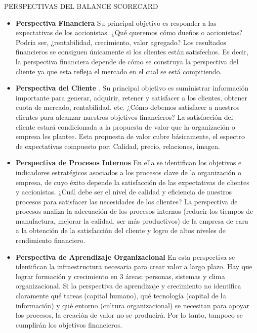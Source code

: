 PERSPECTIVAS DEL BALANCE SCORECARD \newline

\begin{itemize}
\item \textbf{Perspectiva Financiera} Su principal objetivo es responder a las expectativas de los accionistas. ¿Qué queremos cómo dueños o accionistas? Podría ser, ¿rentabilidad, crecimiento, valor agregado? Los resultados financieros se consiguen únicamente si los clientes están satisfechos. Es decir, la perspectiva financiera depende de cómo se construya la perspectiva del cliente ya que esta refleja el mercado en el cual se está compitiendo. 

\item \textbf{Perspectiva del Cliente} . Su principal objetivo es suministrar información importante para generar, adquirir, retener y satisfacer a los clientes, obtener cuota de mercado, rentabilidad, etc. ¿Cómo debemos satisfacer a nuestros clientes para alcanzar nuestros objetivos financieros? La satisfacción del cliente estará condicionada a la propuesta de valor que la organización o empresa les plantee. Esta propuesta de valor cubre básicamente, el espectro de expectativas compuesto por: Calidad, precio, relaciones, imagen.

\item \textbf{Perspectiva de Procesos Internos} En ella se identifican los objetivos e indicadores estratégicos asociados a los procesos clave de la organización o empresa, de cuyo éxito depende la satisfacción de las expectativas de clientes y accionistas. ¿Cuál debe ser el nivel de calidad y eficiencia de nuestros procesos para satisfacer las necesidades de los clientes? La perspectiva de procesos analiza la adecuación de los procesos internos (reducir los tiempos de manufactura, mejorar la calidad, ser más productivos) de la empresa de cara a la obtención de la satisfacción del cliente y logro de altos niveles de rendimiento financiero.

\item \textbf{Perspectiva de Aprendizaje Organizacional} En esta perspectiva se identifican la infraestructura necesaria para crear valor a largo plazo. Hay que lograr formación y crecimiento en 3 áreas: personas, sistemas y clima organizacional. Si la perspectiva de aprendizaje y crecimiento no identifica claramente qué tareas (capital humano), qué tecnología (capital de la información) y qué entorno (cultura organizacional) se necesitan para apoyar los procesos, la creación de valor no se producirá. Por lo tanto, tampoco se cumplirán los objetivos financieros.\newline
\end{itemize}

